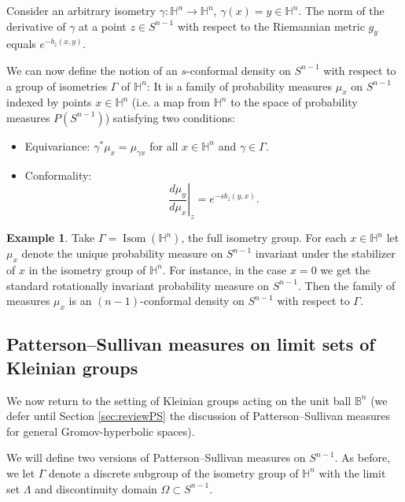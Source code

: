 \documentclass[12pt]{amsbook}%
\theoremstyle{definition}
\newtheorem{example}[thm]{Example}
\theoremstyle{remark}
\numberwithin{section}{chapter}
\numberwithin{subsection}{section}
\numberwithin{figure}{chapter}
\DeclareMathOperator{\Isom}{Isom}
\def\bB{{\mathbb{B}}}
\def\bH{{\mathbb{H}}}
\def\Ga{\Gamma}
\def\ga{\gamma}
\def\La{\Lambda}
\def\kap{}
\begin{document}
{{Consider an arbitrary isometry $\ga: \bH^n\to \bH^n$, $\ga(x)=y\in \bH^n$. The norm of the derivative of $\ga$ at a point 
$z\in S^{n-1}$ with respect to the Riemannian metric $g_y$ equals
$e^{-b_z(x,y)}$.  

We can now define the notion of an $s$-conformal density on $S^{n-1}$ with respect to a group of isometries $\Ga$ of $\bH^n$:
It is a family of probability measures $\mu_x$ on $S^{n-1}$ 
indexed by points $x\in \bH^n$ (i.e. a map from $\bH^n$ to the space of probability measures $P(S^{n-1})$) 
satisfying two conditions:

\begin{itemize}
\item Equivariance: $\ga^*\mu_x=\mu_{\ga x}$ for all $x\in \bH^n$ and $\ga\in \Ga$. 

\item Conformality:
$$
\left. \frac{d\mu_y}{d\mu_x}\right\vert_z= e^{-s b_z(y,x)}.
$$ 
\end{itemize}

\begin{example}
Take $\Ga=\Isom(\bH^n)$, the full isometry group. For each $x\in \bH^n$ let $\mu_x$ denote the unique  probability measure on $S^{n-1}$ invariant under the stabilizer of $x$ in the isometry group of $\bH^n$. For instance, in the case $x=0$ we get the standard rotationally invariant probability measure on $S^{n-1}$. Then the family of measures $\mu_x$ is an $(n-1)$-conformal density on $S^{n-1}$ with respect to $\Ga$. 
\end{example}


\medskip 








\subsection{Patterson--Sullivan measures on limit sets of Kleinian groups}

We now return to the setting of Kleinian groups acting on the unit ball $\bB^n$ (we defer until 
Section \ref{sec:reviewPS} the discussion of Patterson--Sullivan measures for general Gromov-hyperbolic spaces).  

We will define two versions of Patterson--Sullivan measures on $S^{n-1}$. As before, we let $\Ga$ denote a discrete subgroup of the isometry group of $\bH^n$ with the limit set $\La$ and discontinuity domain $\Omega\subset S^{n-1}$. 

}}
\end{document}
